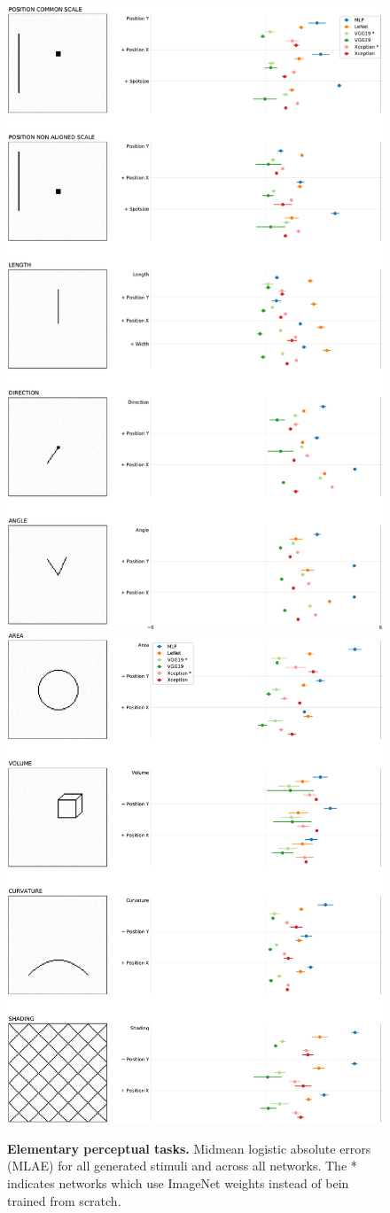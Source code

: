 \documentclass[journal]{vgtc}                %
\begin{document}


\begin{figure}[p]
	\centering
		\includegraphics[width=.48\linewidth]{../gfx/figure1_slim_left.pdf}
	  \includegraphics[width=.48\linewidth]{../gfx/figure1_slim_right.pdf}
  \caption{\textbf{Elementary perceptual tasks.} Midmean logistic absolute errors (MLAE) for all generated stimuli and across all networks. The * indicates networks which use ImageNet weights instead of bein trained from scratch.}
	\label{fig:epc_mlae}
\end{figure}
\end{document}

